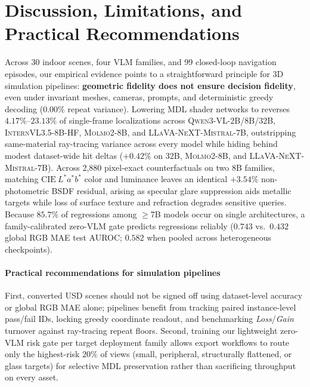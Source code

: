 \section{Discussion, Limitations, and Practical Recommendations}
\label{sec:conclusion}

Across 30 indoor scenes, four VLM families, and 99 closed-loop navigation episodes, our empirical evidence points to a straightforward principle for 3D simulation pipelines: \textbf{geometric fidelity does not ensure decision fidelity}, even under invariant meshes, cameras, prompts, and deterministic greedy decoding ($0.00\%$ repeat variance). Lowering \textsc{MDL} shader networks to \usdps{} reverses $4.17\%\text{--}23.13\%$ of single-frame localizations across \textsc{Qwen3-VL-2B/8B/32B}, \textsc{InternVL3.5-8B-HF}, \textsc{Molmo2-8B}, and \textsc{LLaVA-NeXT-Mistral-7B}, outstripping same-material ray-tracing variance across every model while hiding behind modest dataset-wide hit deltas ($+0.42\%$ on 32B, \textsc{Molmo2-8B}, and \textsc{LLaVA-NeXT-Mistral-7B}). Across 2,880 pixel-exact counterfactuals on two 8B families, matching $\mathrm{CIE}~L^*a^*b^*$ color and luminance leaves an identical $+3.54\%$ non-photometric \textsc{BSDF} residual, arising as specular glare suppression aids metallic targets while loss of surface texture and refraction degrades sensitive queries. Because $85.7\%$ of regressions among $\ge$7B models occur on single architectures, a family-calibrated zero-\textsc{VLM} gate predicts regressions reliably ($0.743$ vs.\ $0.432$ global \textsc{RGB MAE} test \textsc{AUROC}; $0.582$ when pooled across heterogeneous checkpoints).

\paragraph{Practical recommendations for simulation pipelines}
First, converted \textsc{USD} scenes should not be signed off using dataset-level accuracy or global \textsc{RGB MAE} alone; pipelines benefit from tracking paired instance-level pass/fail IDs, locking greedy coordinate readout, and benchmarking \emph{Loss}/\emph{Gain} turnover against ray-tracing repeat floors. Second, training our lightweight zero-\textsc{VLM} risk gate per target deployment family allows export workflows to route only the highest-risk $20\%$ of views (small, peripheral, structurally flattened, or glass targets) for selective \textsc{MDL} preservation rather than sacrificing throughput on every asset.

